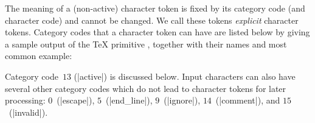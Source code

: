 \documentclass{l3doc}
\begin{document}
The meaning of a (non-active) character token is fixed by its category
code (and character code) and cannot be changed.  We call these tokens
\emph{explicit} character tokens.  Category codes that a character token
can have are listed below by giving a sample output of the \TeX{}
primitive , together with their  names and most
common example:
Category code~$13$ (|active|) is discussed below.  Input characters can
also have several other category codes which do not lead to character
tokens for later processing: $0$~(|escape|), $5$~(|end_line|),
$9$~(|ignore|), $14$~(|comment|), and $15$~(|invalid|).
\end{document}
